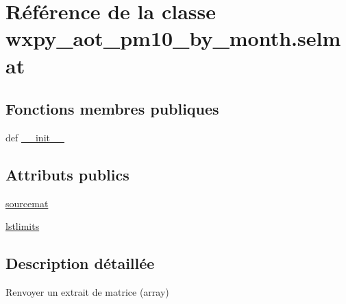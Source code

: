 \hypertarget{classwxpy__aot__pm10__by__month_1_1selmat}{\section{Référence de la classe wxpy\-\_\-aot\-\_\-pm10\-\_\-by\-\_\-month.\-selmat}
\label{classwxpy__aot__pm10__by__month_1_1selmat}
}
\subsection*{Fonctions membres publiques}
\begin{DoxyCompactItemize}
\item 
def \hyperlink{classwxpy__aot__pm10__by__month_1_1selmat_a1f44457b40f609e39e7f330cd4c0e669}{\-\_\-\-\_\-init\-\_\-\-\_\-}
\end{DoxyCompactItemize}
\subsection*{Attributs publics}
\begin{DoxyCompactItemize}
\item 
\hyperlink{classwxpy__aot__pm10__by__month_1_1selmat_a91b6cf14ce6fdab2c952f05773900a47}{sourcemat}
\item 
\hyperlink{classwxpy__aot__pm10__by__month_1_1selmat_a14381ca92cfac6add3dfaddab060b68e}{lstlimits}
\end{DoxyCompactItemize}


\subsection{Description détaillée}
\begin{DoxyVerb}Renvoyer un extrait de matrice (array) \end{DoxyVerb}
 

